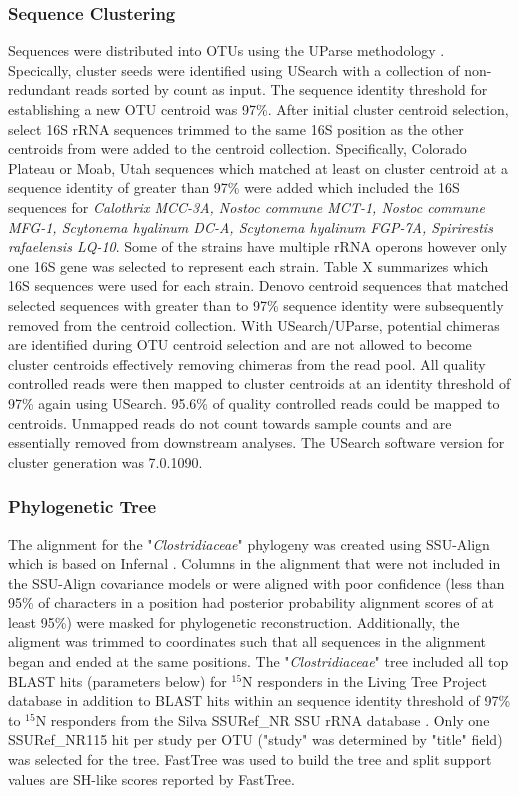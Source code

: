 \subsubsection{Sequence Clustering}
Sequences were distributed into OTUs using the UParse methodology \cite{23955772}. Specically, cluster seeds were identified using USearch with a collection of non-redundant reads sorted by count as input. The sequence identity threshold for establishing a new OTU centroid was 97\%. After initial cluster centroid selection, select 16S rRNA sequences trimmed to the same 16S position as the other centroids from \citet{Yeager} were added to the centroid collection. Specifically, \citet{Yeager} Colorado Plateau or Moab, Utah sequences which matched at least on cluster centroid at a sequence identity of greater than 97\% were added which included the 16S sequences for \textit{Calothrix MCC-3A, Nostoc commune MCT-1, Nostoc commune MFG-1, Scytonema hyalinum DC-A, Scytonema hyalinum FGP-7A, Spirirestis rafaelensis LQ-10}. Some of the \citet{Yeager} strains have multiple rRNA operons however only one 16S gene was selected to represent each strain. Table X summarizes which 16S sequences were used for each strain. Denovo centroid sequences that matched selected \citet{Yeager} sequences with greater than to 97\% sequence identity were subsequently removed from the centroid collection. With USearch/UParse, potential chimeras are identified during OTU centroid selection and are not allowed to become cluster centroids effectively removing chimeras from the read pool. All quality controlled reads were then mapped to cluster centroids at an identity threshold of 97\% again using USearch. 95.6\% of quality controlled reads could be mapped to centroids. Unmapped reads do not count towards sample counts and are essentially removed from downstream analyses. The USearch software version for cluster generation was 7.0.1090.

\subsubsection{Phylogenetic Tree}
The alignment for the "\textit{Clostridiaceae}" phylogeny was created using SSU-Align which is based on Infernal \cite{24008419, 19307242}. Columns in the alignment that were not included in the SSU-Align covariance models or were aligned with poor confidence (less than 95\% of characters in a position had posterior probability alignment scores of at least 95\%) were masked for phylogenetic reconstruction. Additionally, the aligment was trimmed to coordinates such that all sequences in the alignment began and ended at the same positions. The "\textit{Clostridiaceae}" tree included all top BLAST hits (parameters below) for $^{15}$N responders in the Living Tree Project database \cite{Yarza_2008} in addition to BLAST hits within an sequence identity threshold of 97\% to $^{15}$N responders from the Silva SSURef\_NR SSU rRNA database \cite{17947321}. Only one SSURef\_NR115 hit per study per OTU ("study" was determined by "title" field) was selected for the tree. FastTree \cite{20224823} was used to build the tree and split support values are SH-like scores reported by FastTree.

